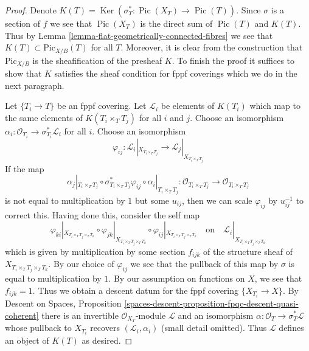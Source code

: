 \documentclass{stacks-project}
\theoremstyle{plain}
\theoremstyle{definition}
\theoremstyle{remark}
\numberwithin{equation}{subsection}
\def\Ker{\mathop{\mathrm{Ker}}}
\def\Pic{\mathop{\mathrm{Pic}}\nolimits}
\def\Picardfunctor{\mathrm{Pic}}
\begin{document}
\begin{proof}
Denote $K(T) = \Ker(\sigma_T^* : \Pic(X_T) \to \Pic(T))$.
Since $\sigma$ is a section of $f$ we see that $\Pic(X_T)$ is the direct
sum of $\Pic(T)$ and $K(T)$.
Thus by Lemma \ref{lemma-flat-geometrically-connected-fibres} we see that
$K(T) \subset \Picardfunctor_{X/B}(T)$ for all $T$. Moreover, it is clear
from the construction that $\Picardfunctor_{X/B}$ is the sheafification
of the presheaf $K$. To finish the proof it suffices to show that
$K$ satisfies the sheaf condition for fppf coverings which we do
in the next paragraph.

\medskip\noindent
Let $\{T_i \to T\}$ be an fppf covering. Let $\mathcal{L}_i$ be
elements of $K(T_i)$ which map to the same elements of $K(T_i \times_T T_j)$
for all $i$ and $j$. Choose an isomorphism
$\alpha_i : \mathcal{O}_{T_i} \to \sigma_{T_i}^*\mathcal{L}_i$
for all $i$. Choose an isomorphism
$$
\varphi_{ij} :
\mathcal{L}_i|_{X_{T_i \times_T T_j}}
\longrightarrow
\mathcal{L}_j|_{X_{T_i \times_T T_j}}
$$
If the map
$$
\alpha_j|_{T_i \times_T T_j} \circ
\sigma_{T_i \times_T T_j}^*\varphi_{ij} \circ
\alpha_i|_{T_i \times_T T_j} :
\mathcal{O}_{T_i \times_T T_j} \to \mathcal{O}_{T_i \times_T T_j}
$$
is not equal to multiplication by $1$ but some $u_{ij}$, then we can scale
$\varphi_{ij}$ by $u_{ij}^{-1}$ to correct this. Having done this, consider
the self map
$$
\varphi_{ki}|_{X_{T_i \times_T T_j \times_T T_k}} \circ
\varphi_{jk}|_{X_{T_i \times_T T_j \times_T T_k}} \circ
\varphi_{ij}|_{X_{T_i \times_T T_j \times_T T_k}}
\quad\text{on}\quad
\mathcal{L}_i|_{X_{T_i \times_T T_j \times_T T_k}}
$$
which is given by multiplication by some section $f_{ijk}$
of the structure sheaf of $X_{T_i \times_T T_j \times_T T_k}$.
By our choice of $\varphi_{ij}$ we see that the pullback of
this map by $\sigma$ is equal to multiplication by $1$. By
our assumption on functions on $X$, we see that $f_{ijk} = 1$.
Thus we obtain a descent datum for the fppf covering
$\{X_{T_i} \to X\}$. By
Descent on Spaces, Proposition
\ref{spaces-descent-proposition-fpqc-descent-quasi-coherent}
there is an invertible $\mathcal{O}_{X_T}$-module $\mathcal{L}$
and an isomorphism $\alpha : \mathcal{O}_T \to \sigma_T^*\mathcal{L}$
whose pullback to $X_{T_i}$ recovers $(\mathcal{L}_i, \alpha_i)$
(small detail omitted). Thus $\mathcal{L}$ defines an object
of $K(T)$ as desired.
\end{proof}
\end{document}
